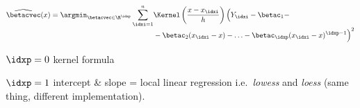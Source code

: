 \begin{defnbox}\nospacing
    \begin{defn}\label{defn:local_polynomial_regression}
        \begin{align}
          \widehat{\betacvec}(x)=\argmin_{\betacvec\in\R^{\idxp}}\sum_{\idxi=1}^{n}&\Kernel \left(\frac{x-x_{\idxi}}{h}\right)
          \Big(Y_{\idxi}-\betac_{1}-\\[-1\jot]
          &-\betac_{2}(x_{\idxi}-x)-\ldots-\betac_{\idxp}(x_{\idxi}-x)^{\idxp-1}\Big)^{2}\nonumber
        \end{align}
    \end{defn}
\end{defnbox}
\begin{notebox}[Notes]\nospacing
   \begin{itemizenosep}
       \item $\idxp=0$ kernel formula
       \item $\idxp=1$ intercept \& slope = local linear regression i.e.\ \textit{lowess} and \textit{loess}
       (same thing, different implementation).
   \end{itemizenosep}
\end{notebox}
